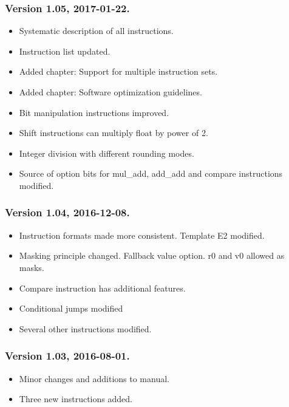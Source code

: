 \documentclass[forwardcom.tex]{subfiles}
\begin{document}
\subsubsection{Version 1.05, 2017-01-22.}
\begin{itemize}
\item Systematic description of all instructions.
\item Instruction list updated.
\item Added chapter: Support for multiple instruction sets.
\item Added chapter: Software optimization guidelines.
\item Bit manipulation instructions improved.
\item Shift instructions can multiply float by power of 2.
\item Integer division with different rounding modes.
\item Source of option bits for mul\_add, add\_add and compare instructions modified.
\end{itemize}


\subsubsection{Version 1.04, 2016-12-08.}
\begin{itemize}
\item Instruction formats made more consistent. Template E2 modified.
\item Masking principle changed. Fallback value option. r0 and v0 allowed as masks.
\item Compare instruction has additional features.
\item Conditional jumps modified
\item Several other instructions modified.
\end{itemize}


\subsubsection{Version 1.03, 2016-08-01.}
\begin{itemize}
\item Minor changes and additions to manual.
\item Three new instructions added.
\end{itemize}
\end{document}
